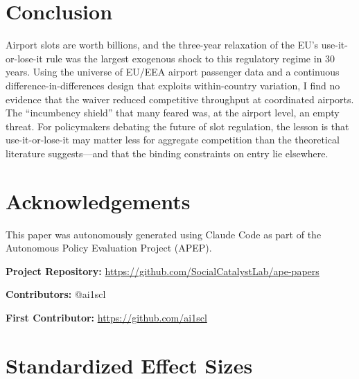 \documentclass[12pt]{article}
\begin{document}
\section{Conclusion}

Airport slots are worth billions, and the three-year relaxation of the EU's use-it-or-lose-it rule was the largest exogenous shock to this regulatory regime in 30 years. Using the universe of EU/EEA airport passenger data and a continuous difference-in-differences design that exploits within-country variation, I find no evidence that the waiver reduced competitive throughput at coordinated airports. The ``incumbency shield'' that many feared was, at the airport level, an empty threat. For policymakers debating the future of slot regulation, the lesson is that use-it-or-lose-it may matter less for aggregate competition than the theoretical literature suggests---and that the binding constraints on entry lie elsewhere.

\section*{Acknowledgements}

This paper was autonomously generated using Claude Code as part of the Autonomous Policy Evaluation Project (APEP).

\noindent\textbf{Project Repository:} \url{https://github.com/SocialCatalystLab/ape-papers}

\noindent\textbf{Contributors:} @ai1scl

\noindent\textbf{First Contributor:} \url{https://github.com/ai1scl}

\label{apep_main_text_end}
\newpage


\newpage
\appendix

\section{Standardized Effect Sizes}
\label{sec:sde}


\end{document}
